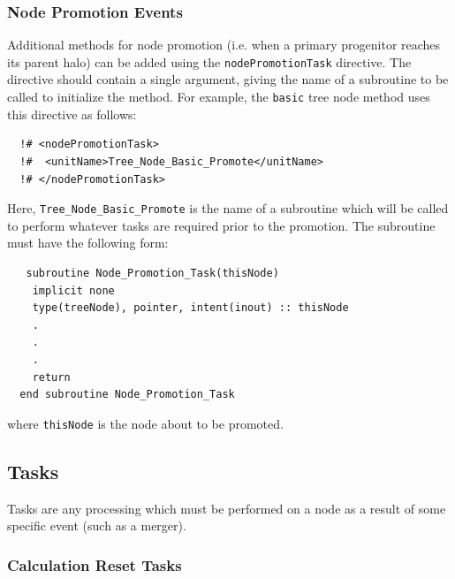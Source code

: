 \subsubsection{Node Promotion Events}

Additional methods for node promotion (i.e. when a primary progenitor reaches its parent halo) can be added using the {\tt nodePromotionTask} directive. The directive should contain a single argument, giving the name of a subroutine to be called to initialize the method. For example, the {\tt basic} tree node method uses this directive as follows:
\begin{verbatim}
  !# <nodePromotionTask>
  !#  <unitName>Tree_Node_Basic_Promote</unitName>
  !# </nodePromotionTask>
\end{verbatim}
Here, {\tt Tree\_Node\_Basic\_Promote} is the name of a subroutine which will be called to perform whatever tasks are required prior to the promotion. The subroutine must have the following form:
\begin{verbatim}
   subroutine Node_Promotion_Task(thisNode)
    implicit none
    type(treeNode), pointer, intent(inout) :: thisNode
    .
    .
    .
    return
  end subroutine Node_Promotion_Task
\end{verbatim}
where {\tt thisNode} is the node about to be promoted.

\subsection{Tasks}

Tasks are any processing which must be performed on a node as a result of some specific event (such as a merger).

\subsubsection{Calculation Reset Tasks}\label{sec:CalculationResetTask}

